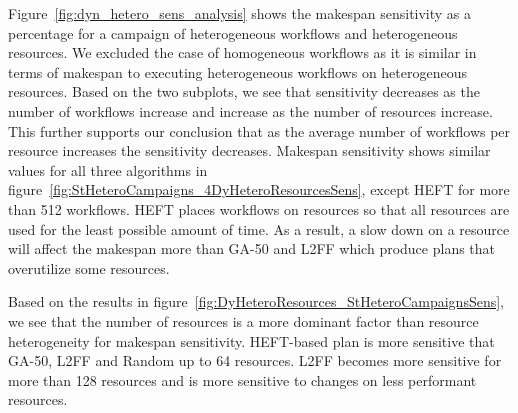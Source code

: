Figure~\ref{fig:dyn_hetero_sens_analysis} shows the makespan sensitivity as a percentage for a campaign of heterogeneous workflows and heterogeneous resources.
We excluded the case of homogeneous workflows as it is similar in terms of makespan to executing heterogeneous workflows on heterogeneous resources.
Based on the two subplots, we see that sensitivity decreases as the number of workflows increase and increase as the number of resources increase.
This further supports our conclusion that as the average number of workflows per resource increases the sensitivity decreases.
Makespan sensitivity shows similar values for all three algorithms in figure~\ref{fig:StHeteroCampaigns_4DyHeteroResourcesSens}, except HEFT for more than 512 workflows.
HEFT places workflows on resources so that all resources are used for the least possible amount of time.
As a result, a slow down on a resource will affect the makespan more than GA-50 and L2FF which produce plans that overutilize some resources.

Based on the results in figure~\ref{fig:DyHeteroResources_StHeteroCampaignsSens}, we see that the number of resources is a more dominant factor than resource heterogeneity for makespan sensitivity.
HEFT-based plan is more sensitive that GA-50, L2FF and Random up to 64 resources.
L2FF becomes more sensitive for more than 128 resources and is more sensitive to changes on less performant resources.

